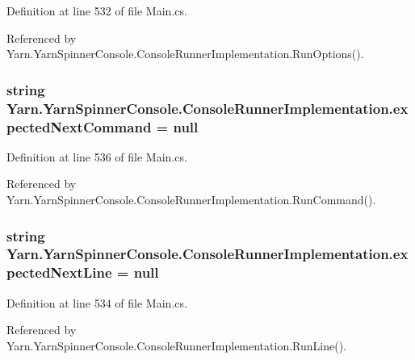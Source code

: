Definition at line 532 of file Main.\-cs.



Referenced by Yarn.\-Yarn\-Spinner\-Console.\-Console\-Runner\-Implementation.\-Run\-Options().

\hypertarget{a00056_a3c7133c65dc7cf293f49b61426a0c4aa}{
\subsubsection[{expected\-Next\-Command}]{\setlength{\rightskip}{0pt plus 5cm}string Yarn.\-Yarn\-Spinner\-Console.\-Console\-Runner\-Implementation.\-expected\-Next\-Command = null}}\label{a00056_a3c7133c65dc7cf293f49b61426a0c4aa}


Definition at line 536 of file Main.\-cs.



Referenced by Yarn.\-Yarn\-Spinner\-Console.\-Console\-Runner\-Implementation.\-Run\-Command().

\hypertarget{a00056_a33a44e39f2d90850cee234dfad50f2c5}{
\subsubsection[{expected\-Next\-Line}]{\setlength{\rightskip}{0pt plus 5cm}string Yarn.\-Yarn\-Spinner\-Console.\-Console\-Runner\-Implementation.\-expected\-Next\-Line = null}}\label{a00056_a33a44e39f2d90850cee234dfad50f2c5}


Definition at line 534 of file Main.\-cs.



Referenced by Yarn.\-Yarn\-Spinner\-Console.\-Console\-Runner\-Implementation.\-Run\-Line().

